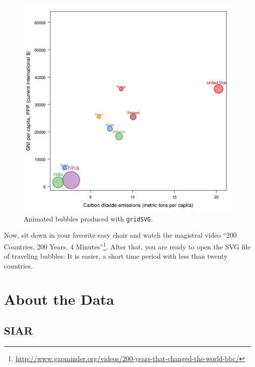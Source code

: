 \documentclass[smallroyalvopaper]{memoir}
\begin{document}
\begin{figure}
  \centering
  \includegraphics[width=\textwidth]{figs/bubbles.png}
  \caption{Animated bubbles produced with \texttt{gridSVG}.}
  \label{fig:bubblesSVG}
\end{figure}

Now, sit down in your favorite easy chair and watch the magistral
video ``200 Countries, 200 Years, 4 Minutes''\footnote{\url{http://www.gapminder.org/videos/200-years-that-changed-the-world-bbc/}}. After that, you are
ready to open the SVG file of traveling bubbles: It is easier, a short
time period with less than twenty countries.

\chapter{About the Data}
\label{sec:orgc57b862}
\label{cha:dataTime}

\section{SIAR}
\label{sec:org0ca2455}
\end{document}
